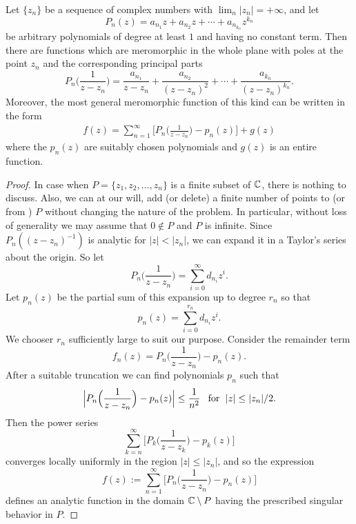 \begin{theorem}
Let $\{z_n\}$ be a sequence of complex numbers with $\lim_n|z_n|=+\infty$, and let
\[P_n(z)=a_{n_1}z+a_{n_2}z+\cdots+a_{n_{k_n}}z^{k_n}\]
be arbitrary polynomials of degree at least $1$ and having no constant term. Then there are functions which are meromorphic in the whole plane with poles at the point $z_n$ and the corresponding principal parts
\[P_n\Big(\frac{1}{z-z_n}\Big)=\frac{a_{n_1}}{z-z_n}+\frac{a_{n_2}}{(z-z_n)^2}+\cdots+\frac{a_{k_n}}{(z-z_n)^{k_n}}.\]
Moreover, the most general meromorphic function of this kind can be written in the form
\begin{align}\label{Mittag-Leffler on C}
f(z)=\sum_{n=1}^{\infty}\Big[P_n\Big(\frac{1}{z-z_n}\Big)-p_n(z)\Big]+g(z)
\end{align}
where the $p_n(z)$ are suitably chosen polynomials and $g(z)$ is an entire function.
\end{theorem}
\begin{proof}
In case when $P=\{z_1,z_2,\dots,z_n\}$ is a finite subset of $\mathbb{C}$, there is nothing to discuss. Also, we can at our will, add (or delete) a finite number of points to (or from ) $P$ without changing the nature of the problem. In particular, without loss of generality we may assume that $0\notin P$ and $P$ is infinite. Since $P_n((z-z_n)^{-1})$ is analytic
for $|z|<|z_n|$, we can expand it in a Taylor's series about the origin. So let
\[P_n\Big(\frac{1}{z-z_n}\Big)=\sum_{i=0}^{\infty}d_{n_i}z^i.\]
Let $p_n(z)$ be the partial sum of this expansion up to degree $r_n$ so that
\[p_n(z)=\sum_{i=0}^{r_n}d_{n_i}z^i.\]
We chooser $r_n$ sufficiently large to suit our purpose. Consider the remainder term
\[f_n(z)=P_n\Big(\frac{1}{z-z_n}\Big)-p_n(z).\]
After a suitable truncation we can find polynomials $p_n$ such that
\[\Big|P_n\Big(\frac{1}{z-z_n}\Big)-p_n(z)\Big|\leq\frac{1}{n^2}\hspace{8pt}\text{for}\hspace{6pt} |z|\leq|z_n|/2.\]
Then the power series
\[\sum_{k=n}^{\infty}\Big[P_k\Big(\frac{1}{z-z_k}\Big)-p_k(z)\Big]\]
converges locally uniformly in the region $|z|\leq|z_n|$, and so the expression
\[f(z):=\sum_{n=1}^{\infty}\Big[P_n\Big(\frac{1}{z-z_n}\Big)-p_n(z)\Big]\]
defines an analytic function in the domain $\mathbb{C}\setminus P$ having the prescribed singular behavior in $P$.
\end{proof}
